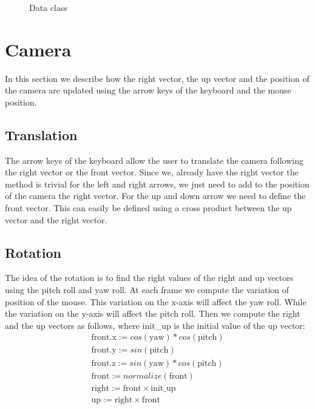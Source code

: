 \documentclass[a4paper,12pt,journal,twoside,compsoc]{PPIEEEtran}
\begin{document}
\begin{figure}
\centering
{}
\caption{Data class}
\label{Fig:umldata}
\end{figure}

\section{Camera}
\label{cam}
In this section we describe how the right vector, the up vector and the
position of the camera are updated using the arrow keys of the keyboard and the
mouse position.

\subsection{Translation}

The arrow keys of the keyboard allow the user to translate the camera following
the right vector or the front vector. Since we, already have the right vector
the method is trivial for the left and right arrows, we just need to add to the
position of the camera the right vector. For the up and down arrow we need to
define the front vector. This can easily be defined using a cross product between
the up vector and the right vector.

\subsection{Rotation}

The idea of the rotation is to find the right values of the right and up vectors
using the pitch roll and yaw roll. At each frame we compute the variation
of position of the mouse. This variation on the x-axis will affect the yaw
roll. While the variation on the y-axis will affect the pitch roll. Then
we compute the right and the up vectors as follows, where init\_up is the
initial value of the up vector:
\begin{align*}
  \text{front.x} := cos(\text{yaw}) * cos(\text{pitch}) \\
  \text{front.y} := sin(\text{pitch}) \\
  \text{front.z} := sin(\text{yaw}) * cos(\text{pitch}) \\
  \text{front} := normalize(\text{front}) \\
  \text{right} := \text{front} \times \text{init\_up} \\
  \text{up} := \text{right} \times \text{front} \\
\end{align*}
\end{document}
